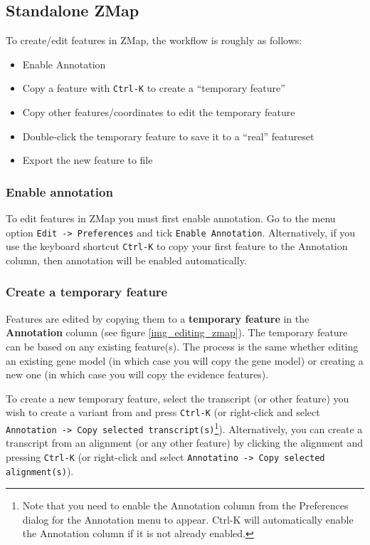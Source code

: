 \documentclass[letterpaper]{article}
\begin{document}
\subsection{Standalone ZMap}
To create/edit features in ZMap, the workflow is roughly as follows:
\begin{itemize}
\item Enable Annotation
\item Copy a feature with \lstinline{Ctrl-K} to create a ``temporary feature''
\item Copy other features/coordinates to edit the temporary feature
\item Double-click the temporary feature to save it to a ``real'' featureset
\item Export the new feature to file
\end{itemize}

\subsubsection{Enable annotation}
To edit features in ZMap you must first enable annotation. Go to the menu option \lstinline{Edit -> Preferences} and tick \lstinline{Enable Annotation}. Alternatively, if you use the keyboard shortcut \lstinline{Ctrl-K} to copy your first feature to the Annotation column, then annotation will be enabled automatically.

\subsubsection{Create a temporary feature}
Features are edited by copying them to a \textbf{temporary feature} in the \textbf{Annotation} column (see figure \ref{img_editing_zmap}). The temporary feature can be based on any existing feature(s). The process is the same whether editing an existing gene model (in which case you will copy the gene model) or creating a new one (in which case you will copy the evidence features).

To create a new temporary feature, select the transcript (or other feature) you wish to create a variant from and press \lstinline{Ctrl-K} (or right-click and select \lstinline{Annotation -> Copy selected transcript(s)}\footnote{Note that you need to enable the Annotation column from the Preferences dialog for the Annotation menu to appear. Ctrl-K will automatically enable the Annotation column if it is not already enabled.}). Alternatively, you can create a transcript from an alignment (or any other feature) by clicking the alignment and pressing \lstinline{Ctrl-K} (or right-click and select \lstinline{Annotatino -> Copy selected alignment(s)}).
\end{document}
